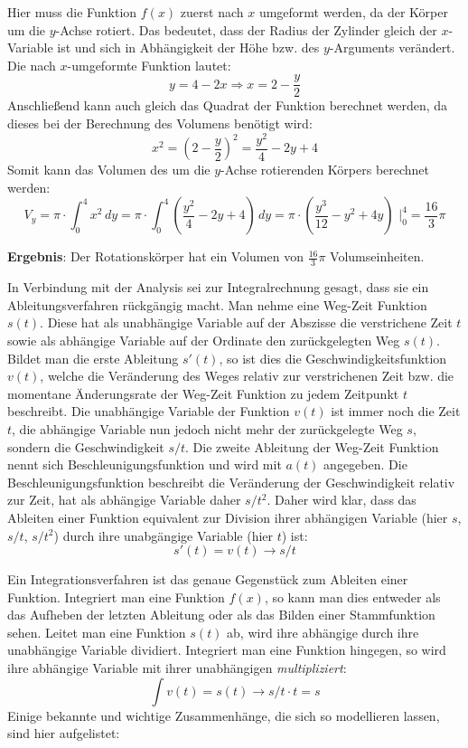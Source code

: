 Hier muss die Funktion $f(x)$ zuerst nach $x$ umgeformt werden, da der K\"{o}rper um die $y$-Achse rotiert. Das bedeutet, dass der Radius der Zylinder gleich der $x$-Variable ist und sich in Abh\"{a}ngigkeit der H\"{o}he bzw. des $y$-Arguments ver\"{a}ndert. Die nach $x$-umgeformte Funktion lautet: $$y = 4 - 2x \Rightarrow x = 2 - \frac{y}{2}$$ Anschlie\ss{}end kann auch gleich das Quadrat der Funktion berechnet werden, da dieses bei der Berechnung des Volumens ben\"{o}tigt wird: $$x^2 = \left(2 - \frac{y}{2}\right)^2 = \frac{y^2}{4} - 2y + 4$$ Somit kann das Volumen des um die $y$-Achse rotierenden K\"{o}rpers berechnet werden: $$V_y = \pi \cdot \int_0^4 x^2 \, dy = \pi \cdot \int_0^4 \left( \frac{y^2}{4} - 2y + 4 \right) \, dy = \pi \cdot \left( \frac{y^3}{12} - y^2 + 4y \right) \,\, \bigg |_0^4 = \frac{16}{3} \pi $$

\textbf{Ergebnis}: Der Rotationsk\"{o}rper hat ein Volumen von $\frac{16}{3}\pi$ Volumseinheiten.

\pagebreak


In Verbindung mit der Analysis sei zur Integralrechnung gesagt, dass sie ein Ableitungsverfahren r\"{u}ckg\"{a}ngig macht. Man nehme eine Weg-Zeit Funktion $s(t)$. Diese hat als unabh\"{a}ngige Variable auf der Abszisse die verstrichene Zeit $t$ sowie als abh\"{a}ngige Variable auf der Ordinate den zur\"{u}ckgelegten Weg $s(t)$. Bildet man die erste Ableitung $s'(t)$, so ist dies die Geschwindigkeitsfunktion $v(t)$, welche die Ver\"{a}nderung des Weges relativ zur verstrichenen Zeit bzw. die momentane \"{A}nderungsrate der Weg-Zeit Funktion zu jedem Zeitpunkt $t$ beschreibt. Die unabh\"{a}ngige Variable der Funktion $v(t)$ ist immer noch die Zeit $t$, die abh\"{a}ngige Variable nun jedoch nicht mehr der zur\"{u}ckgelegte Weg $s$, sondern die Geschwindigkeit $s/t$. Die zweite Ableitung der Weg-Zeit Funktion nennt sich Beschleunigungsfunktion und wird mit $a(t)$ angegeben. Die Beschleunigungsfunktion beschreibt die Ver\"{a}nderung der Geschwindigkeit relativ zur Zeit, hat als abh\"{a}ngige Variable daher $s/t^2$. Daher wird klar, dass das Ableiten einer Funktion equivalent zur Division ihrer abh\"{a}ngigen Variable (hier $s$, $s/t$, $s/t^2$) durch ihre unabg\"{a}ngige Variable (hier $t$) ist: $$s'(t) = v(t) \rightarrow s/t$$

Ein Integrationsverfahren ist das genaue Gegenst\"{u}ck zum Ableiten einer Funktion. Integriert man eine Funktion $f(x)$, so kann man dies entweder als das Aufheben der letzten Ableitung oder als das Bilden einer Stammfunktion sehen. Leitet man eine Funktion $s(t)$ ab, wird ihre abh\"{a}ngige durch ihre unabh\"{a}ngige Variable dividiert. Integriert man eine Funktion hingegen, so wird ihre abh\"{a}ngige Variable mit ihrer unabh\"{a}ngigen \emph{multipliziert}: $$\int v(t) = s(t) \rightarrow s/t \cdot t = s$$ Einige bekannte und wichtige Zusammenh\"{a}nge, die sich so modellieren lassen, sind hier aufgelistet:

